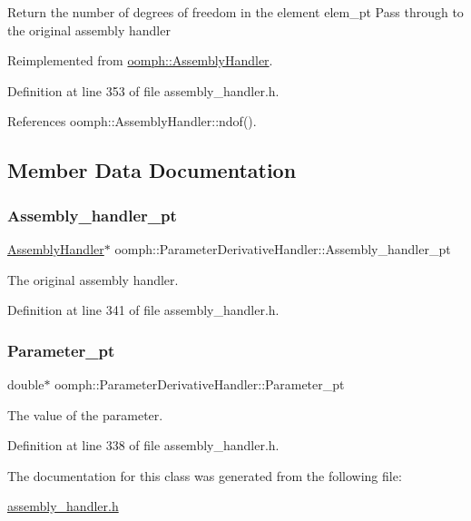 Return the number of degrees of freedom in the element elem\+\_\+pt Pass through to the original assembly handler 

Reimplemented from \hyperlink{classoomph_1_1AssemblyHandler_a09213be8f4aa009e0366460a7ed78e68}{oomph\+::\+Assembly\+Handler}.



Definition at line 353 of file assembly\+\_\+handler.\+h.



References oomph\+::\+Assembly\+Handler\+::ndof().



\subsection{Member Data Documentation}
\mbox{\label{classoomph_1_1ParameterDerivativeHandler_aaaf6a918c81462544d3ea1fbc108b8e8}} 
\subsubsection{\texorpdfstring{Assembly\+\_\+handler\+\_\+pt}{Assembly\_handler\_pt}}
{\footnotesize\ttfamily \hyperlink{classoomph_1_1AssemblyHandler}{Assembly\+Handler}$\ast$ oomph\+::\+Parameter\+Derivative\+Handler\+::\+Assembly\+\_\+handler\+\_\+pt\hspace{0.3cm}{\ttfamily [private]}}



The original assembly handler. 



Definition at line 341 of file assembly\+\_\+handler.\+h.

\mbox{\label{classoomph_1_1ParameterDerivativeHandler_a4915174c5f1663bf9df2b0ba1cff56e6}} 
\subsubsection{\texorpdfstring{Parameter\+\_\+pt}{Parameter\_pt}}
{\footnotesize\ttfamily double$\ast$ oomph\+::\+Parameter\+Derivative\+Handler\+::\+Parameter\+\_\+pt\hspace{0.3cm}{\ttfamily [private]}}



The value of the parameter. 



Definition at line 338 of file assembly\+\_\+handler.\+h.



The documentation for this class was generated from the following file\+:\begin{DoxyCompactItemize}
\item 
\hyperlink{assembly__handler_8h}{assembly\+\_\+handler.\+h}\end{DoxyCompactItemize}
